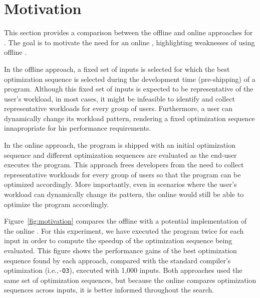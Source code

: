 \section{Motivation}



This section provides a comparison between the offline and online approaches for
{\itercomp}.
The goal is to motivate the need for an online {\itercomp}, highlighting
weaknesses of using offline {\itercomp}.

In the offline approach, a fixed set of inputs is selected for which the best
optimization sequence is selected during the development time (pre-shipping) of
a program.
Although this fixed set of inputs is expected to be representative of the user's
workload,
in most cases, it might be infeasible to identify and collect representative
workloads for every group of users.
Furthermore, a user can dynamically change its workload pattern, rendering
a fixed optimization sequence innapropriate for his performance requirements.

In the online approach, the program is shipped with an initial optimization
sequence and different optimization sequences are evaluated as the end-user
executes the program.
This approach frees developers from the need to collect representative
workloads for every group of users so that the program can be optimized
accordingly.
More importantly, even in scenarios where the user's workload can dynamically
change its pattern, the online {\itercomp} would still be able to optimize the
program accordingly.

Figure~\ref{fig:motivation} compares the offline {\itercomp} with a potential
implementation of the online {\itercomp}.
For this experiment, we have executed the program twice for each input
in order to compute the speedup of the optimization sequence being evaluated.
This figure shows the performance gains of the best optimization 
sequence found by each approach, compared with the standard
compiler's optimization (i.e.,\texttt{-O3}), executed with 1,000 inputs.
Both approaches used the same set of optimization sequences, but because
the online {\itercomp} compares optimization sequences across inputs,
it is better informed throughout the search.

